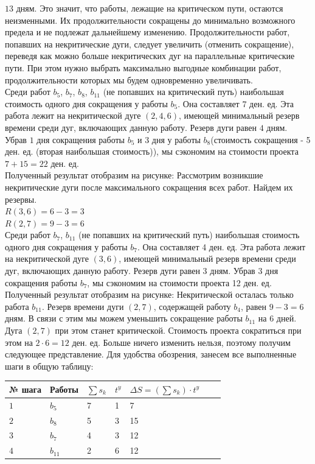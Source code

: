 \documentclass[a4paper, 12pt]{report}
\begin{document}
	$13$ дням. Это значит, что работы, лежащие на критическом пути, остаются неизменными. Их продолжительности сокращены до минимально возможного предела и не подлежат дальнейшему изменению. Продолжительности работ, попавших на некритические дуги, следует увеличить (отменить сокращение), переведя как можно больше некритических дуг на параллельные критические пути. При этом нужно выбрать максимально выгодные комбинации работ, продолжительности которых мы будем одновременно увеличивать.\\
	Среди работ $b_5$, $b_7$, $b_8$, $b_{11}$ (не попавших на критический путь) наибольшая стоимость одного дня сокращения у работы $b_5$. Она составляет 7 ден. ед.  Эта работа лежит на некритической дуге $(2,4,6)$, имеющей минимальный резерв времени среди дуг, включающих данную работу. Резерв дуги равен $4$ дням. Убрав $1$ дня сокращения работы $b_5$ и 3 дня у работы $b_8$(стоимость сокращения - 5 ден. ед. (вторая наибольшая стоимость)), мы сэкономим на стоимости проекта $7+15=22$ ден. ед.\\
	Полученный результат отобразим на рисунке:
	Рассмотрим возникшие некритические дуги после максимального сокращения всех работ. Найдем их резервы.\\
	$R(3,6)=6-3=3$\\
	$R(2,7)=9-3=6$\\
	Среди работ $b_7$, $b_{11}$ (не попавших на критический путь) наибольшая стоимость одного дня сокращения у работы $b_7$. Она составляет 4 ден. ед.  Эта работа лежит на некритической дуге $(3,6)$, имеющей минимальный резерв времени среди дуг, включающих данную работу. Резерв дуги равен $3$ дням. Убрав $3$ дня сокращения работы $b_7$, мы сэкономим на стоимости проекта 12 ден. ед.\\
	Полученный результат отобразим на рисунке:
	Некритической осталась только работа $b_{11}$. Резерв времени дуги $(2,7)$, содержащей работу $b_4$, равен $9-3=6$ дням. В связи с этим мы можем уменьшить сокращение работы $b_{11}$ на $6$ дней. Дуга $(2,7)$ при этом станет критической. Стоимость проекта сократиться при этом на $2\cdot 6=12$ ден. ед. Больше ничего изменить нельзя, поэтому получим следующее представление.
	Для удобства обозрения, занесем все выполненные шаги в общую таблицу:\\
	\begin{tabular}{ |p{2cm}||p{2cm}||p{2cm}||p{1cm}||p{3cm}||p{1cm}||p{2cm}|}
		\hline
		№ шага & Работы & $\sum s_k$ & $t^y$ & $\Delta S=\left(\sum s_k\right)\cdot t^y$ \\
		\hline
		$1$ & $b_5$ & 7 & 1 &7\\
		$2$ & $b_8$ & 5 & 3 & 15\\
		$3$ & $b_7$ & 4 & 3 & 12 \\
		$4$ & $b_{11}$ & 2 & 6 & 12\\
		\hline
	\end{tabular}\\\\
\end{document}

